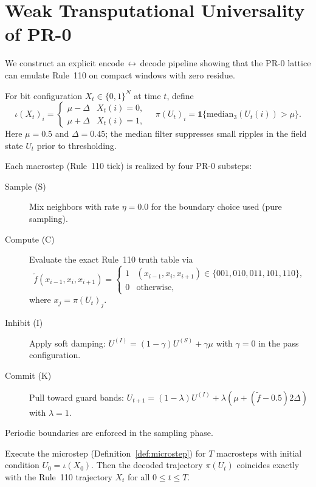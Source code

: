 \section{Weak Transputational Universality of PR-0}

We construct an explicit encode\,$\leftrightarrow$\,decode pipeline showing that the PR-0 lattice can emulate Rule~110 on compact windows with zero residue.

\begin{definition}\label{def:pr0_encode_decode}
For bit configuration $X_t\in\{0,1\}^N$ at time $t$, define
\[
\iota(X_t)_i =
\begin{cases}
\mu - \Delta & X_t(i)=0,\\
\mu + \Delta & X_t(i)=1,
\end{cases}
\quad
\pi(U_t)_i = \mathbf{1}\{\mathrm{median}_3(U_t(i)) > \mu\}.
\]
Here $\mu=0.5$ and $\Delta=0.45$; the median filter suppresses small ripples in the field state $U_t$ prior to thresholding.
\end{definition}

\begin{definition}\label{def:microstep}
Each macrostep (Rule~110 tick) is realized by four PR-0 substeps:
\begin{description}
\item[Sample (S)] Mix neighbors with rate $\eta=0.0$ for the boundary choice used (pure sampling).
\item[Compute (C)] Evaluate the exact Rule~110 truth table via
\[
\tilde{f}(x_{i-1},x_i,x_{i+1}) = 
\begin{cases}
1 & (x_{i-1},x_i,x_{i+1}) \in \{001,010,011,101,110\},\\
0 & \text{otherwise,}
\end{cases}
\]
where $x_j=\pi(U_t)_j$.
\item[Inhibit (I)] Apply soft damping: $U^{(I)} = (1-\gamma)U^{(S)} + \gamma \mu$ with $\gamma=0$ in the pass configuration.
\item[Commit (K)] Pull toward guard bands: $U_{t+1} = (1-\lambda)U^{(I)} + \lambda(\mu + (\tilde{f}-0.5)2\Delta)$ with $\lambda=1$.
\end{description}
Periodic boundaries are enforced in the sampling phase.
\end{definition}

\begin{theorem}\label{thm:pr0_wtu}
Execute the microstep (Definition~\ref{def:microstep}) for $T$ macrosteps with initial condition $U_0 = \iota(X_0)$. Then the decoded trajectory $\pi(U_t)$ coincides exactly with the Rule~110 trajectory $X_t$ for all $0\le t\le T$.
\end{theorem}

